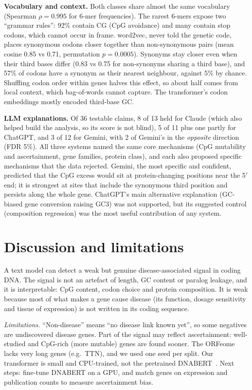 \documentclass[11pt,a4paper,twocolumn]{article}
\begin{document}
\textbf{Vocabulary and context.} Both classes share almost the same vocabulary
(Spearman $\rho=0.995$ for 6-mer frequencies). The rarest 6-mers expose two
``grammar rules'': 92\% contain CG (CpG avoidance) and many contain stop codons,
which cannot occur in frame. word2vec, never told the genetic code,
places synonymous codons closer together than non-synonymous pairs (mean cosine
0.85 vs 0.71, permutation $p=0.0005$). Synonyms stay closer even when their third
bases differ (0.83 vs 0.75 for non-synonyms sharing a third base), and 57\% of codons have a synonym as their
nearest neighbour, against 5\% by chance. Shuffling codon order within genes
halves this effect, so about half comes from local context, which bag-of-words
cannot capture. The transformer's codon embeddings mostly encoded third-base GC.

\textbf{LLM explanations.} Of 36 testable claims, 8 of 13 held for
Claude (which also helped build the analysis, so its score is not blind), 5 of 11
plus one partly for ChatGPT, and 3 of 12 for Gemini, with 2 of Gemini's in the
\emph{opposite} direction (FDR 5\%). All three systems named the same core mechanisms (CpG mutability and
ascertainment, gene families, protein class), and each also proposed specific
mechanisms that the data rejected. Gemini, the most specific and confident,
predicted that the CpG excess would sit at protein-changing positions near the
5$'$ end; it is strongest at sites that include the synonymous third position and
persists along the whole gene. ChatGPT's main alternative explanation (GC-biased
gene conversion raising GC3) was not supported, but its suggested control
(composition regression) was the most useful contribution of any system.

\section{Discussion and limitations}
A text model can detect a weak but genuine disease-associated signal in coding
DNA. The signal is not an artefact of length, GC content or paralog leakage, and
it is interpretable: CpG content, codon choice and protein composition. It is
weak because most of what makes a gene cause disease (its function, dosage
sensitivity and tissue of expression) is not written in its coding sequence.

\emph{Limitations.} ``Non-disease'' means ``no disease link known yet'', so some
negatives are undiscovered disease genes. Part of the signal may reflect
ascertainment: well-studied and CpG-rich (more mutable) genes are found sooner.
The ORFeome lacks very long genes (e.g.\ TTN), and we used one seed per split.
Our transformer is small and CPU-trained, not the pretrained
DNABERT~\cite{ji2021dnabert}. Next steps: fine-tune DNABERT on a GPU, and match
genes on expression and publication counts to measure ascertainment bias.
\end{document}
